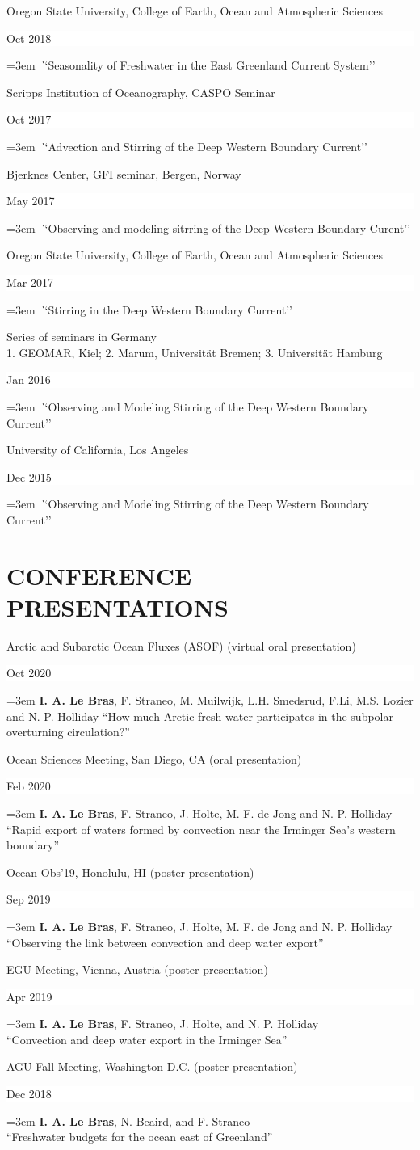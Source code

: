 \documentclass[paper=letter,fontsize=11pt]{scrartcl} %
\newcommand{\sepspace}{\vspace*{3mm}}		%
\newcommand{\NewPart}[2]{\section*{\uppercase{#1} #2}}
\newcommand{\TalkEntry}[3]{
		\noindent #1 \hfill      %
		\colorbox{White}{%
			\parbox{6em}{%
			\hfill\color{Black}#2}} \par  %
		\noindent\hangindent=3em\hangafter=0 \textit ``#3''\sepspace} %
\newcommand{\ConfEntry}[5]{
		\noindent #1 (#2) \hfill      %
		\colorbox{White}{%
			\parbox{6em}{%
			\hfill\color{Black}#3}} \par %
		\noindent \hangindent=3em\hangafter=0 #4 ``#5'' \sepspace}
\begin{document}
\TalkEntry{Oregon State University, College of Earth, Ocean and Atmospheric Sciences}{Oct 2018}{Seasonality of Freshwater in the East Greenland Current System}

\TalkEntry{Scripps Institution of Oceanography, CASPO Seminar}{Oct 2017}{Advection and Stirring of the Deep Western Boundary Current}

\TalkEntry{Bjerknes Center, GFI seminar, Bergen, Norway}{May 2017}{Observing and modeling sitrring of the Deep Western Boundary Curent}

\TalkEntry{Oregon State University, College of Earth, Ocean and Atmospheric Sciences}{Mar 2017}{Stirring in the Deep Western Boundary Current}

\TalkEntry{Series of seminars in Germany \\ 1. GEOMAR, Kiel; 2. Marum, Universit\"at Bremen; 3. Universit\"at Hamburg}{Jan 2016}{Observing and Modeling Stirring of the Deep Western Boundary Current}

\TalkEntry{University of California, Los Angeles}{Dec 2015}{Observing and Modeling Stirring of the Deep Western Boundary Current}

\NewPart{Conference presentations}{}

\ConfEntry{Arctic and Subarctic Ocean Fluxes (ASOF)}{virtual oral presentation}{Oct 2020}{\textbf{I. A. Le Bras}, F. Straneo, M. Muilwijk, L.H. Smedsrud, F.Li, M.S. Lozier and N. P. Holliday}{How much Arctic fresh water participates in the subpolar overturning circulation?}

\ConfEntry{Ocean Sciences Meeting, San Diego, CA}{oral presentation}{Feb 2020}{\textbf{I. A. Le Bras}, F. Straneo, J. Holte, M. F. de Jong and N. P. Holliday\\}{Rapid export of waters formed by convection near the Irminger Sea's western boundary}


\ConfEntry{Ocean Obs'19, Honolulu, HI}{poster presentation}{Sep 2019}{\textbf{I. A. Le Bras}, F. Straneo, J. Holte, M. F. de Jong and N. P. Holliday\\}{Observing the link between convection and deep water export}

\ConfEntry{EGU Meeting, Vienna, Austria}{poster presentation}{Apr 2019}{\textbf{I. A. Le Bras}, F. Straneo, J. Holte, and N. P. Holliday\\}{Convection and deep water export in the Irminger Sea}

\ConfEntry{AGU Fall Meeting, Washington D.C.}{poster presentation}{Dec 2018}{\textbf{I. A. Le Bras}, N. Beaird, and F. Straneo\\}{Freshwater budgets for the ocean east of Greenland}
\end{document}
